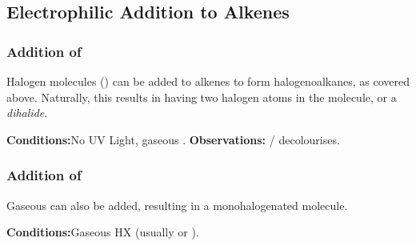 

		\pagebreak
		\subsection{Electrophilic Addition to Alkenes}

			\subsubsection{Addition of }

				Halogen molecules () can be added to alkenes to form halogenoalkanes, as covered above. Naturally, this results in
				having two halogen atoms in the molecule, or a \textit{dihalide}.

				\vspace{1.5em}
				\vbox{\textbf{Conditions:}\tabto{35mm}No UV Light, gaseous .}
				\vbox{\textbf{Observations:}\tabto{35mm}  /   decolourises.}


			\subsubsection{Addition of }

				Gaseous  can also be added, resulting in a monohalogenated molecule.

				\vspace{1.5em}
				\vbox{\textbf{Conditions:}\tabto{35mm}Gaseous HX (usually  or ).}


		\pagebreak
		\hypertarget{NSubAlcohols}{}
